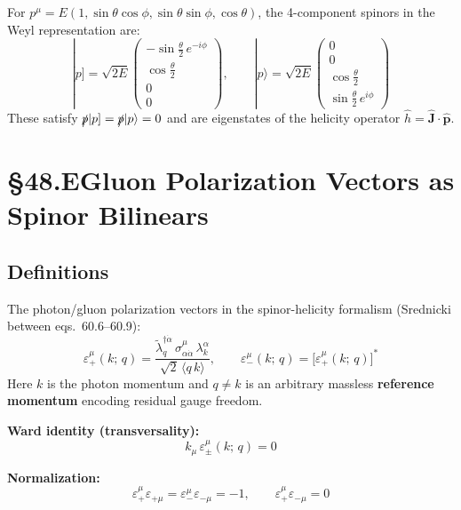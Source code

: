 For $p^\mu = E(1,\sin\theta\cos\phi,\sin\theta\sin\phi,\cos\theta)$, the
4-component spinors in the Weyl representation are:
\begin{equation}
  |p] = \sqrt{2E}\begin{pmatrix}-\sin\tfrac\theta2\,e^{-i\phi} \\ \cos\tfrac\theta2 \\ 0 \\ 0\end{pmatrix},
  \qquad
  |p\rangle = \sqrt{2E}\begin{pmatrix}0 \\ 0 \\ \cos\tfrac\theta2 \\ \sin\tfrac\theta2\,e^{i\phi}\end{pmatrix}
  \tag{48.11}
\end{equation}
These satisfy $\slashed{p}|p]=\slashed{p}|p\rangle=0$ and are eigenstates of
the helicity operator $\hat h = \hat{\mathbf{J}}\cdot\hat{\mathbf{p}}$.

\section{§48.E\quad Gluon Polarization Vectors as Spinor Bilinears}

\subsection{Definitions}

The photon/gluon polarization vectors in the spinor-helicity formalism
(Srednicki between eqs.~60.6--60.9):
\begin{equation}
  \boxed{
    \varepsilon_+^\mu(k;\,q) = \frac{\tilde\lambda_q^{\dagger\dot\alpha}\,\sigma^\mu_{\alpha\dot\alpha}\,\lambda_k^\alpha}{\sqrt{2}\,\langle q\,k\rangle},
    \qquad
    \varepsilon_-^\mu(k;\,q) = \bigl[\varepsilon_+^\mu(k;\,q)\bigr]^*
  }
  \tag{48.12}
\end{equation}
Here $k$ is the photon momentum and $q\neq k$ is an arbitrary massless
\textbf{reference momentum} encoding residual gauge freedom.

\textbf{Ward identity (transversality):}
\begin{equation}
  k_\mu\,\varepsilon_\pm^\mu(k;\,q) = 0
  \tag{48.13}
\end{equation}

\textbf{Normalization:}
\begin{equation}
  \varepsilon_+^\mu\varepsilon_{+\mu} = \varepsilon_-^\mu\varepsilon_{-\mu} = -1,
  \qquad
  \varepsilon_+^\mu\varepsilon_{-\mu} = 0
  \tag{48.14}
\end{equation}

